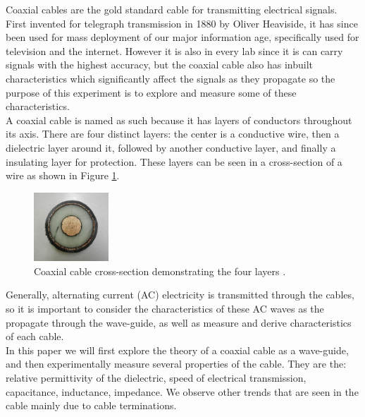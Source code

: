 Coaxial cables are the gold standard cable for transmitting electrical signals. First invented for telegraph transmission in 1880 
by Oliver Heaviside, it has since been used for mass deployment of our major information age, specifically used for television and the internet. However it is also in every lab since it is can carry signals with the highest accuracy, but the coaxial cable also has inbuilt characteristics which significantly affect the signals as they propagate so the purpose of this experiment is to explore and measure some of these characteristics.\\

A coaxial cable is named as such because it has layers of conductors throughout its axis. There are four distinct layers: the center is a conductive wire, then a dielectric layer around it, followed by another conductive layer, and finally a insulating layer for protection. These layers can be seen in a cross-section of a wire as shown in Figure \ref{fig:Cable}.

\begin{figure}[H]
\centering
\includegraphics[width=0.25\textwidth]{figures/Coaxial_cable.jpg}
\caption{Coaxial cable cross-section demonstrating the four layers \cite{pict_cable}. }
\label{fig:Cable}
\end{figure}

Generally, alternating current (AC) electricity is transmitted through the cables, so it is important to consider the characteristics of these AC waves as the propagate through the wave-guide, as well as measure and derive characteristics of each cable.\\

In this paper we will first explore the theory of a coaxial cable as a wave-guide, and then experimentally measure several properties of the cable. They are the: relative permittivity of the dielectric, speed of electrical transmission, capacitance, inductance, impedance. We observe other trends that are seen in the cable mainly due to cable terminations.